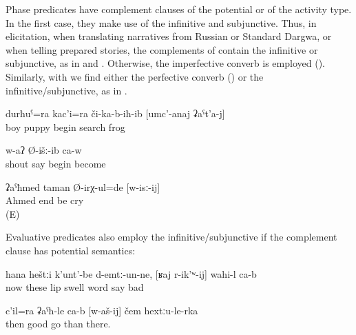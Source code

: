 Phase predicates have complement clauses of the potential or of the activity type. In the first case, they make use of the infinitive and subjunctive. Thus, in elicitation, when translating narratives from Russian or Standard Dargwa, or when telling prepared stories, the complements of  contain the infinitive or subjunctive, as in  and . Otherwise, the imperfective converb is employed (). Similarly, with  we find either the perfective converb () or the infinitive/subjunctive, as in .
%
\begin{exe}
	\ex	\label{ex:‎The boy and the frog began to search for the frog}
	\gll	durħuˁ=ra	kac'i=ra	či-ka-b-iħ-ib	[umc'-anaj	ʡaˁt'a-j]\\
		boy	puppy	begin	search	frog\\
	\glt	{}

	\ex	\label{ex:He began to shout}
	\gll	[waˁw	Ø-ik'ʷ-ij]	w-aʔ	Ø-išː-ib	ca-w\\
		shout	say	\tsc{m-}begin	become	\\
	\glt	{}

	\ex	\label{ex:Ahmed stopped crying}
	\gll	ʡaˁħmed taman Ø-irχ-ul=de	[w-isː-ij]\\
		Ahmed end	be	cry\\
	\glt	{} (E)
\end{exe}

Evaluative predicates also employ the infinitive\slash subjunctive if the complement clause has potential semantics:
%
\begin{exe}
	\ex	\label{ex:‎Now my lips are swollen, it is difficult to talk}
	\gll	hana	heštːi	k'unt'-be	d-emtː-un-ne,	[ʁaj	r-ik'ʷ-ij]	wahi-l	ca-b	\\
		now	these	lip	swell	word	say	bad	\\
	\glt	{}

	\ex	\label{ex:‎It is good (better) to go (on the ice-covered ground) than from there}
	\gll	c'il=ra	ʡaˁħ-le	ca-b	[w-aš-ij]	čem	hextːu-le-rka	\\
		then	good		go	than	there.\\
	\glt	{}
\end{exe}


